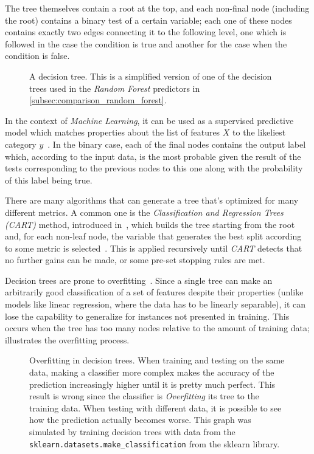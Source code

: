 The tree themselves contain a root at the top, and each non-final node (including the root) contains a binary test of a certain variable; each one of these nodes contains exactly two edges connecting it to the following level, one which is followed in the case the condition is true and another for the case when the condition is false.

\begin{figure}
\centering
{}
\caption{A decision tree. This is a simplified version of one of the decision trees used in the \emph{Random Forest} predictors in \cref{subsec:comparison_random_forest}.}
\label{fig:decision_tree}
\end{figure}

In the context of \emph{Machine Learning}, it can be used as a supervised predictive model which matches properties about the list of features $X$ to the likeliest category $y$~\cite{oded2008decisiontrees}. In the binary case, each of the final nodes contains the output label which, according to the input data, is the most probable given the result of the tests corresponding to the previous nodes to this one along with the probability of this label being true.

There are many algorithms that can generate a tree that's optimized for many different metrics. A common one is the \emph{Classification and Regression Trees (CART)} method, introduced in~\cite{breiman1993classification}, which builds the tree starting from the root and, for each non-leaf node, the variable that generates the best split according to some metric is selected~\cite{loh2011classification}. This is applied recursively until \emph{CART} detects that no further gains can be made, or some pre-set stopping rules are met.

Decision trees are prone to overfitting~\cite{oded2008decisiontrees}. Since a single tree can make an arbitrarily good classification of a set of features despite their properties (unlike models like linear regression, where the data has to be linearly separable), it can lose the capability to generalize for instances not presented in training. This occurs when the tree has too many nodes relative to the amount of training data;  illustrates the overfitting process.

\begin{figure}
\centering
{}
	\caption{Overfitting in decision trees. When training and testing on the same data, making a classifier more complex makes the accuracy of the prediction increasingly higher until it is pretty much perfect. This result is wrong since the classifier is \emph{Overfitting} its tree to the training data. When testing with different data, it is possible to see how the prediction actually becomes worse. This graph was simulated by training decision trees with data from the \texttt{sklearn.datasets.make\_classification} from the sklearn library\cite{scikit-learn}.}
\label{fig:decisiontreeoverfitting}
\end{figure}

